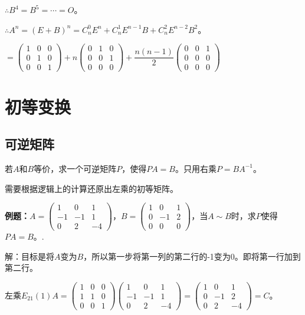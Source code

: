 \documentclass[UTF8, 12pt]{ctexart}
\begin{document}
$\therefore B^4=B^5=\cdots=O$。

$\therefore A^n=(E+B)^n=C_n^0E^n+C_n^1E^{n-1}B+C_n^2E^{n-2}B^2$。\medskip

$=\left(\begin{array}{ccc}
    1 & 0 & 0 \\
    0 & 1 & 0 \\
    0 & 0 & 1
\end{array}\right)+n\left(\begin{array}{ccc}
    0 & 1 & 0 \\
    0 & 0 & 1 \\
    0 & 0 & 0
\end{array}\right)+\dfrac{n(n-1)}{2}\left(\begin{array}{ccc}
    0 & 0 & 1 \\
    0 & 0 & 0 \\
    0 & 0 & 0
\end{array}\right)$

\section{初等变换}

\subsection{可逆矩阵}

若$A$和$B$等价，求一个可逆矩阵$P$，使得$PA=B$。只用右乘$P=BA^{-1}$。

需要根据逻辑上的计算还原出左乘的初等矩阵。\medskip

\textbf{例题：}$A=\left(\begin{array}{ccc}
    1 & 0 & 1 \\
    -1 & -1 & 1 \\
    0 & 2 & -4
\end{array}\right)$，$B=\left(\begin{array}{ccc}
    1 & 0 & 1 \\
    0 & -1 & 2 \\
    0 & 0 & 0
\end{array}\right)$，当$A\sim B$时，求$P$使得$PA=B$。.

解：目标是将$A$变为$B$，所以第一步将第一列的第二行的-1变为0。即将第一行加到第二行。

左乘$E_{21}(1)A=\left(\begin{array}{ccc}
    1 & 0 & 0 \\
    1 & 1 & 0 \\
    0 & 0 & 1
\end{array}\right)\left(\begin{array}{ccc}
    1 & 0 & 1 \\
    -1 & -1 & 1 \\
    0 & 2 & -4
\end{array}\right)=\left(\begin{array}{ccc}
    1 & 0 & 1 \\
    0 & -1 & 2 \\
    0 & 2 & -4
\end{array}\right)=C$。\medskip
\end{document}
